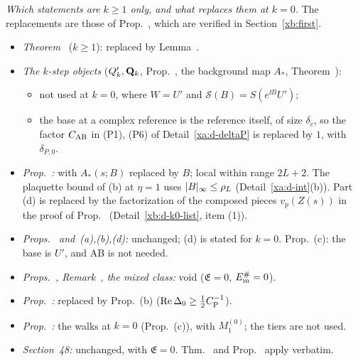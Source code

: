 \begin{detail}[Sections~\Nref{sec:complex-references}--\Nref{sec:cluster} at the first step $k=0$]\label{xa:d-k0}
\emph{Which statements are $k\ge1$ only, and what replaces them at $k=0$.} The replacements are those of Prop.~, which are verified in Section~\ref{xb:first}.
\begin{itemize}
\item \emph{Theorem~} ($k\ge1$): replaced by Lemma~.
\item \emph{The $k$-step objects} ($Q'_k,\mathbf Q_k$, Prop.~, the background map $A_*$, Theorem~):
  \begin{itemize}
  \item not used at $k=0$, where $W=U'$ and $\mathcal S(B)=S(e^{\ii B}U')$;
  \item the base at a complex reference is the reference itself, of size $\delta_c$, so the factor $C_{\rm AB}$ in (P1), (P6) of Detail~\ref{xa:d-deltaP} is replaced by $1$, with $\delta_{P,0}$.
  \end{itemize}
\item \emph{Prop.~:} with $A_*(s;B)$ replaced by $B$; local within range $2L+2$. The plaquette bound of (b) at $\eta=1$ uses $\lvert B\rvert_\infty\le\rho_L$ (Detail~\ref{xa:d-int}(b)). Part (d) is replaced by the factorization of the composed pieces $v_p(Z(s))$ in the proof of Prop.~ (Detail~\ref{xb:d-k0-list}, item (1)).
\item \emph{Props.~ and~(a),(b),(d):} unchanged; (d) is stated for $k=0$. Prop.~(c): the base is $U'$, and AB is not needed.
\item \emph{Props.~, Remark~, the mixed class:} void ($\mathfrak E=0$, $E^\#_{\rm m}=0$).
\item \emph{Prop.~:} replaced by Prop.~(b) ($\operatorname{Re}\Delta_0\ge\frac12C_{\rm P}^{-1}$).
\item \emph{Prop.~:} the walks at $k=0$ (Prop.~(c)), with $M_1^{(0)}$; the tiers are not used.
\item \emph{Section~48:} unchanged, with $\mathfrak E=0$. Thm.~ and Prop.~ apply verbatim.
\end{itemize}
\end{detail}

